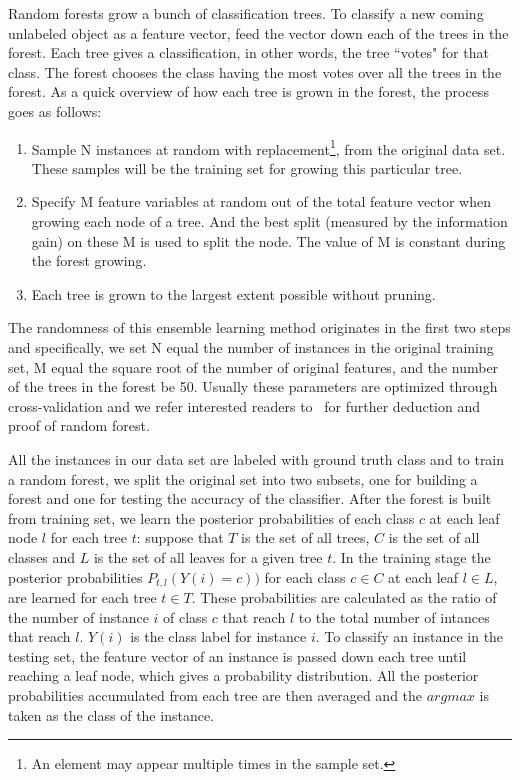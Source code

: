 Random forests grow a bunch of classification trees. To classify a new coming unlabeled object as a feature vector, 
feed the vector down each of the trees in the forest. Each tree gives a classification, in other words, the 
tree ``votes" for that class. The forest chooses the class having the most votes over all the trees in the forest. 
As a quick overview of how each tree is grown in the forest, the process goes as follows:
\begin{enumerate}
\item Sample N instances at random with replacement\footnote{An element may appear multiple times in the sample set.}, from the original data set. These samples will be the training set for growing this particular tree.
\item Specify M feature variables at random out of the total feature vector when growing each node of a tree. And the best split (measured by the information gain) on these M is used to split the node. The value of M is constant during the forest growing.
\item Each tree is grown to the largest extent possible without pruning.
\end{enumerate}
The randomness of this ensemble learning method originates in the first two steps and specifically, we set N equal the number of instances in the original training set, M equal the square root of the
number of original features, and the number of the trees in the forest be 50. Usually these parameters are optimized
through cross-validation and we refer interested readers to~\cite{RF} for further deduction and proof of random forest.

All the instances in our data set are labeled with ground truth class and to train a random forest, we split the original set into two subsets, one for building 
a forest and one for testing the accuracy of the classifier. After the forest is built from training set, we learn the posterior probabilities of each class $c$ 
at each leaf node $l$ for each tree $t$: suppose that $T$ is the set of all trees, $C$ is the set of all classes and $L$ is the set of all leaves for a given 
tree $t$. In the training stage the posterior probabilities $P_{t,l}(Y(i) = c))$ for each class $c\in C$ at each leaf $l\in L$, are learned for each tree $t\in T$. 
These probabilities are calculated as the ratio of the number of instance $i$ of class $c$ that reach $l$ to the total number of intances that reach $l$. $Y(i)$ 
is the class label for instance $i$. To classify an instance in the testing set, the feature vector of an instance is passed down each tree until reaching a leaf 
node, which gives a probability distribution. All the posterior probabilities accumulated from each tree are then averaged and the $argmax$ is taken as the class 
of the instance. 

